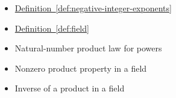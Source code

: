 \begin{dependencies}
\begin{itemize}
  \item \hyperref[def:negative-integer-exponents]{Definition~\ref*{def:negative-integer-exponents}}
  \item \hyperref[def:field]{Definition~\ref*{def:field}}
  \item Natural-number product law for powers
  \item Nonzero product property in a field
  \item Inverse of a product in a field
\end{itemize}
\end{dependencies}

\clearpage

